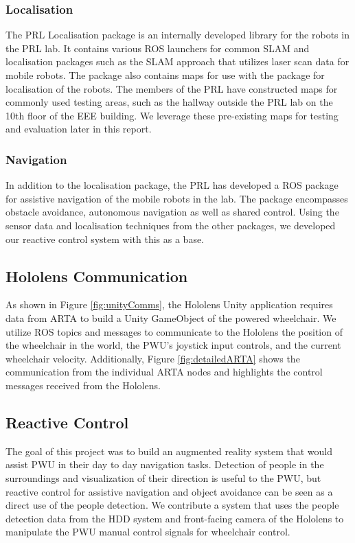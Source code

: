 \subsubsection{Localisation}
The PRL Localisation package is an internally developed library for the robots in the PRL lab. It contains various ROS launchers for common SLAM and localisation packages such as the  SLAM approach that utilizes laser scan data for mobile robots. The package also contains maps for use with the  package for localisation of the robots. The members of the PRL have constructed maps for commonly used testing areas, such as the hallway outside the PRL lab on the 10th floor of the EEE building. We leverage these pre-existing maps for testing and evaluation later in this report.

\subsubsection{Navigation}
In addition to the localisation package, the PRL has developed a ROS package for assistive navigation of the mobile robots in the lab. The package encompasses obstacle avoidance, autonomous navigation as well as shared control. Using the sensor data and localisation techniques from the other packages, we developed our reactive control system with this as a base.

\subsection{Hololens Communication}
As shown in Figure \ref{fig:unityComms}, the Hololens Unity application requires data from ARTA to build a Unity GameObject of the powered wheelchair. We utilize ROS topics and messages to communicate to the Hololens the position of the wheelchair in the world, the PWU's joystick input controls, and the current wheelchair velocity. Additionally, Figure \ref{fig:detailedARTA} shows the communication from the individual ARTA nodes and highlights the control messages received from the Hololens.

\subsection{Reactive Control}
The goal of this project was to build an augmented reality system that would assist PWU in their day to day navigation tasks. Detection of people in the surroundings and visualization of their direction is useful to the PWU, but reactive control for assistive navigation and object avoidance can be seen as a direct use of the people detection. We contribute a system that uses the people detection data from the HDD system and front-facing camera of the Hololens to manipulate the PWU manual control signals for wheelchair control.

